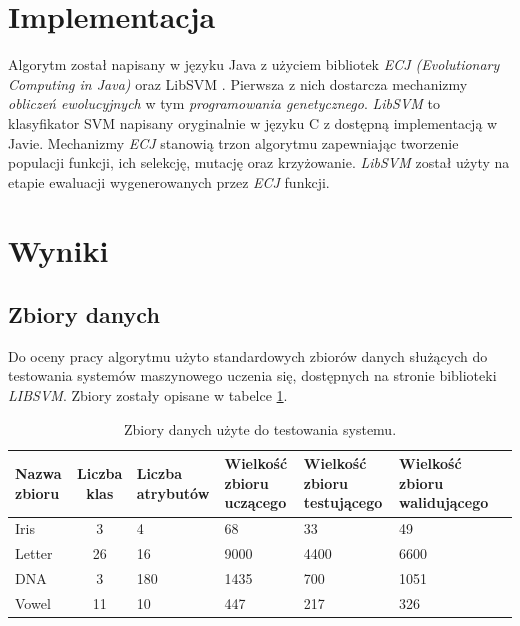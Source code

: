\documentclass{article}
\begin{document}
\section{Implementacja}
Algorytm został napisany w języku Java z użyciem bibliotek \textit{ECJ (Evolutionary Computing in Java)} \cite{sean_ecj_2010} oraz LibSVM \cite{chang_libsvm:_2011}. Pierwsza z nich dostarcza mechanizmy \textit{obliczeń ewolucyjnych} w tym \textit{programowania genetycznego}.
\emph{LibSVM} to klasyfikator SVM napisany oryginalnie w języku C z dostępną implementacją w Javie.
Mechanizmy \emph{ECJ} stanowią trzon algorytmu zapewniając tworzenie populacji funkcji, ich selekcję, mutację oraz krzyżowanie. \emph{LibSVM} został użyty na etapie ewaluacji wygenerowanych przez \emph{ECJ} funkcji.
	
	
	
	


\section{Wyniki}
	\subsection{Zbiory danych}
	Do oceny pracy algorytmu użyto standardowych zbiorów danych służących do testowania systemów maszynowego uczenia się, dostępnych na stronie biblioteki \emph{LIBSVM}. Zbiory zostały opisane w tabelce \ref{tab:datasets}.



\begin{table}[ht]
\begin{tabular}{||p{2cm}|c|p{1.5cm}|p{1.5cm}|p{1.5cm}|p{1.5cm}|p{1.5cm}||}
	\hline 
	Nazwa zbioru & Liczba klas & \hspace{0pt} Liczba atrybutów & \hspace{0pt} Wielkość zbioru uczącego & \hspace{0pt}Wielkość zbioru testującego & \hspace{0pt} Wielkość zbioru walidującego \\
	\hline 
	Iris & 3 & 4 & 68 & 33 & 49  \\ 
	\hline 
	Letter & 26 & 16 & 9000 & 4400 & 6600\\ 
	\hline 
	DNA & 3 & 180 & 1435 & 700 & 1051 \\ 
	\hline 
	Vowel & 11 & 10 & 447 & 217 & 326 \\ 
	\hline
	\end{tabular} 	
	\caption{Zbiory danych użyte do testowania systemu.\label{tab:datasets}} 	
\end{table}
	
\end{document}

